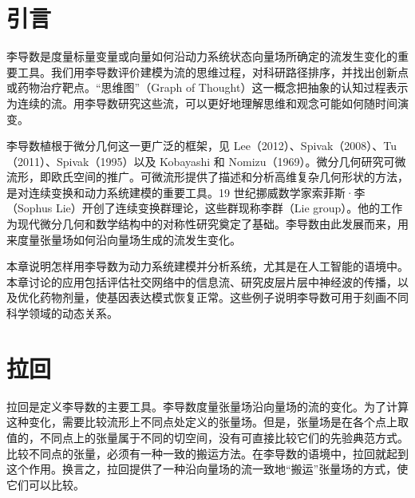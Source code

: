 \section{引言}
李导数是度量标量变量或向量如何沿动力系统状态向量场所确定的流发生变化的重要工具。我们用李导数评价建模为流的思维过程，对科研路径排序，并找出创新点或药物治疗靶点。“思维图”（Graph of Thought）这一概念把抽象的认知过程表示为连续的流。用李导数研究这些流，可以更好地理解思维和观念可能如何随时间演变。

李导数植根于微分几何这一更广泛的框架，见 Lee（2012）、Spivak（2008）、Tu（2011）、Spivak（1995）以及 Kobayashi 和 Nomizu（1969）。微分几何研究可微流形，即欧氏空间的推广。可微流形提供了描述和分析高维复杂几何形状的方法，是对连续变换和动力系统建模的重要工具。19 世纪挪威数学家索菲斯·李（Sophus Lie）开创了连续变换群理论，这些群现称李群（Lie group）。他的工作为现代微分几何和数学结构中的对称性研究奠定了基础。李导数由此发展而来，用来度量张量场如何沿向量场生成的流发生变化。

本章说明怎样用李导数为动力系统建模并分析系统，尤其是在人工智能的语境中。本章讨论的应用包括评估社交网络中的信息流、研究皮层片层中神经波的传播，以及优化药物剂量，使基因表达模式恢复正常。这些例子说明李导数可用于刻画不同科学领域的动态关系。

\section{拉回}
拉回是定义李导数的主要工具。李导数度量张量场沿向量场的流的变化。为了计算这种变化，需要比较流形上不同点处定义的张量场。但是，张量场是在各个点上取值的，不同点上的张量属于不同的切空间，没有可直接比较它们的先验典范方式。比较不同点的张量，必须有一种一致的搬运方法。在李导数的语境中，拉回就起到这个作用。换言之，拉回提供了一种沿向量场的流一致地“搬运”张量场的方式，使它们可以比较。

